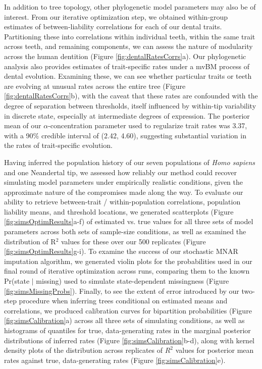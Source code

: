 \documentclass[10pt, twocolumn, twoside]{article}
\begin{document}
In addition to tree topology, other phylogenetic model parameters may also be of interest. From our iterative optimization step, we obtained within-group estimates of between-liability correlations for each of our dental traits. Partitioning these into correlations within individual teeth, within the same trait across teeth, and remaining components, we can assess the nature of modularity across the human dentition (Figure \ref{fig:dentalRatesCorrs}a). Our phylogenetic analysis also provides estimates of trait-specific rates under a mvBM process of dental evolution. Examining these, we can see whether particular traits or teeth are evolving at unusual rates across the entire tree (Figure \ref{fig:dentalRatesCorrs}b), with the caveat that these rates are confounded with the degree of separation between thresholds, itself influenced by within-tip variability in discrete state, especially at intermediate degrees of expression. The posterior mean of our $\alpha$-concentration parameter used to regularize trait rates was 3.37, with a 90\% credible interval of (2.42, 4.60), suggesting substantial variation in the rates of trait-specific evolution.

Having inferred the population history of our seven populations of \textit{Homo sapiens} and one Neandertal tip, we assessed how reliably our method could recover simulating model parameters under empirically realistic conditions, given the approximate nature of the compromises made along the way. To evaluate our ability to retrieve between-trait / within-population correlations, population liability means, and threshold locations, we generated scatterplots (Figure \ref{fig:simsOptimResults}a-f) of estimated vs. true values for all three sets of model parameters across both sets of sample-size conditions, as well as examined the distribution of R$^2$ values for these over our 500 replicates (Figure \ref{fig:simsOptimResults}g-i). To examine the success of our stochastic MNAR imputation algorithm, we generated violin plots for the probabilities used in our final round of iterative optimization across runs, comparing them to the known Pr(state $\vert$ missing) used to simulate state-dependent missingness (Figure \ref{fig:simsMissingProbs}). Finally, to see the extent of error introduced by our two-step procedure when inferring trees conditional on estimated means and correlations, we produced calibration curves for bipartition probabilities (Figure \ref{fig:simsCalibration}a) across all three sets of simulating conditions, as well as histograms of quantiles for true, data-generating rates in the marginal posterior distributions of inferred rates (Figure \ref{fig:simsCalibration}b-d), along with kernel density plots of the distribution across replicates of $R^2$ values for posterior mean rates against true, data-generating rates (Figure \ref{fig:simsCalibration}e).
\end{document}
